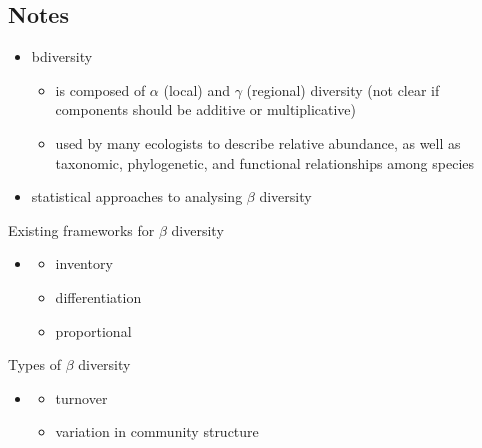 \documentclass[references.tex]{subfiles}
\begin{document}
\subsection{Notes}
\begin{itemize}
    \item \gls{bdiversity} 
    \begin{itemize}
        \item is composed of $\alpha$ (local) and $\gamma$ (regional) 
        diversity (not clear if components should be additive or multiplicative)
        \item used by many ecologists to describe relative abundance, 
        as well as taxonomic, phylogenetic, and functional relationships
        among species
    \end{itemize}
    \item statistical approaches to analysing $\beta$ diversity
\end{itemize}

Existing frameworks for $\beta$ diversity
\begin{itemize}
    \item \citep{JurRet2009}
    \begin{itemize}
        \item inventory
        \item differentiation
        \item proportional
    \end{itemize}
\end{itemize}

Types of $\beta$ diversity
\begin{itemize}
    \item \citep{Vel2001}
    \begin{itemize}
        \item turnover
        \item variation in community structure
   \end{itemize}
\end{itemize}
\end{document}
